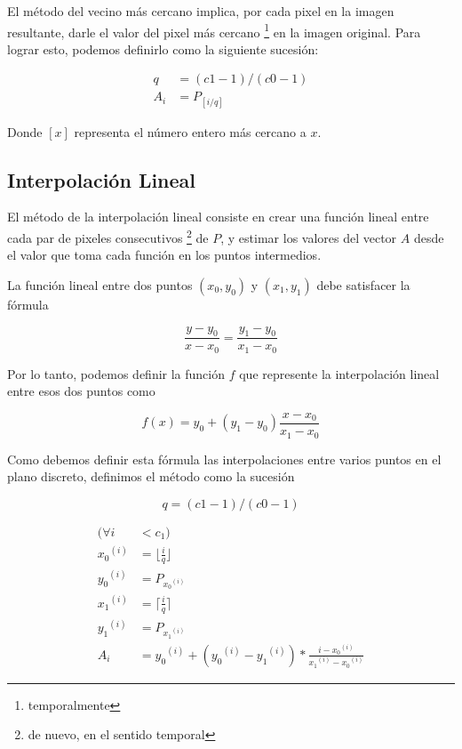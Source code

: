 El m\'etodo del vecino m\'as cercano implica, por cada pixel en la imagen
resultante, darle el valor del pixel m\'as cercano \footnote{temporalmente} en
la imagen original. Para lograr esto, podemos definirlo como la siguiente
sucesi\'on:

\[
\begin{split}
q & = (c1 - 1) / (c0 - 1) \\
A_i & = P_{\left[i / q \right]}
\end{split}
\]

Donde $\left[x\right]$ representa el n\'umero entero m\'as cercano a $x$.

\subsection{Interpolaci\'on Lineal}

El m\'etodo de la interpolaci\'on lineal consiste en crear una funci\'on lineal
entre cada par de pixeles consecutivos \footnote{de nuevo, en el sentido
temporal} de $P$, y estimar los valores del vector $A$ desde el valor que toma
cada funci\'on en los puntos intermedios.

La funci\'on lineal entre dos puntos $\left(x_0, y_0\right)$ y $\left(x_1,
y_1\right)$ debe satisfacer la f\'ormula

\[
\frac{y - y_0}{x - x_0} = \frac{y_1 - y_0}{x_1 - x_0}
\]

Por lo tanto, podemos definir la funci\'on $f$ que represente la interpolaci\'on
lineal entre esos dos puntos como

\[
f(x) = y_0 + (y_1 - y_0) \frac{x - x_0}{x_1 - x_0}
\]

Como debemos definir esta f\'ormula las interpolaciones entre varios puntos en
el plano discreto, definimos el m\'etodo como la sucesi\'on

\[
q = (c1 - 1) / (c0 - 1)
\]

\[
\begin{split}
(\forall i & < c_1) \\
{x_0}^{(i)} & = \lfloor \frac{i}{q} \rfloor \\
{y_0}^{(i)} & = P_{{x_0}^{(i)}} \\
{x_1}^{(i)} & = \lceil \frac{i}{q} \rceil \\
{y_1}^{(i)} & = P_{{x_1}^{(i)}} \\
A_i & = {y_0}^{(i)} + ({y_0}^{(i)} - {y_1}^{(i)}) * \frac{i - {x_0}^{(i)}}{{x_1}^{(i)} - {x_0}^{(i)}}
\end{split}
\]

